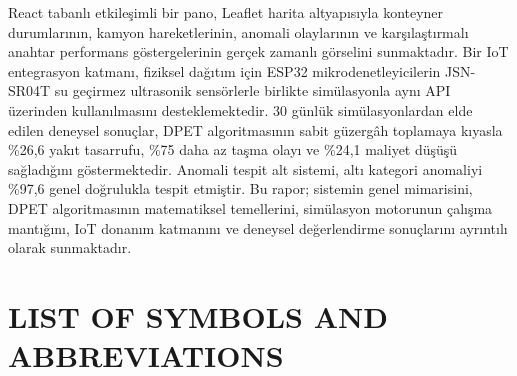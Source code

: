 \documentclass[12pt,a4paper]{report}
\begin{document}
\indent React tabanl\i{} etkile\c{s}imli bir pano, Leaflet harita altyap\i{}s\i{}yla konteyner durumlar\i{}n\i{}n, kamyon hareketlerinin, anomali olaylar\i{}n\i{}n ve kar\c{s}\i{}la\c{s}t\i{}rmal\i{} anahtar performans g\"ostergelerinin ger\c{c}ek zamanl\i{} g\"orselini sunmaktad\i{}r. Bir IoT entegrasyon katman\i{}, fiziksel da\u{g}\i{}t\i{}m i\c{c}in ESP32 mikrodenetleyicilerin JSN-SR04T su ge\c{c}irmez ultrasonik sens\"orlerle birlikte sim\"ulasyonla ayn\i{} API \"uzerinden kullan\i{}lmas\i{}n\i{} desteklemektedir. 30 g\"unl\"uk sim\"ulasyonlardan elde edilen deneysel sonu\c{c}lar, DPET algoritmas\i{}n\i{}n sabit g\"uzerg\^ah toplamaya k\i{}yasla \%26,6 yak\i{}t tasarrufu, \%75 daha az ta\c{s}ma olay\i{} ve \%24,1 maliyet d\"u\c{s}\"u\c{s}\"u sa\u{g}lad\i{}\u{g}\i{}n\i{} g\"ostermektedir. Anomali tespit alt sistemi, alt\i{} kategori anomaliyi \%97,6 genel do\u{g}rulukla tespit etmi\c{s}tir. Bu rapor; sistemin genel mimarisini, DPET algoritmas\i{}n\i{}n matematiksel temellerini, sim\"ulasyon motorunun \c{c}al\i{}\c{s}ma mant\i{}\u{g}\i{}n\i{}, IoT donan\i{}m katman\i{}n\i{} ve deneysel de\u{g}erlendirme sonu\c{c}lar\i{}n\i{} ayr\i{}nt\i{}l\i{} olarak sunmaktad\i{}r.

\clearpage



\renewcommand{\contentsname}{TABLE OF CONTENTS}
\tableofcontents\clearpage
\renewcommand{\listfigurename}{FIGURE LIST}
\listoffigures\clearpage
\renewcommand{\listtablename}{TABLE LIST}
\listoftables\clearpage

\chapter*{LIST OF SYMBOLS AND ABBREVIATIONS}
\end{document}
